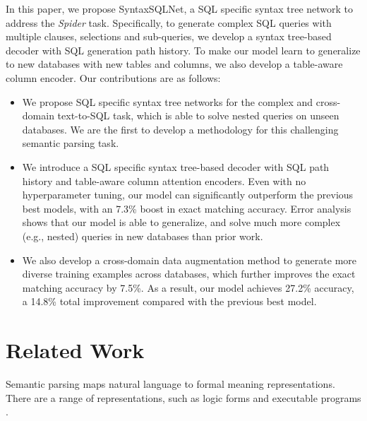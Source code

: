 \documentclass[11pt,a4paper]{article}
\begin{document}
In this paper, we propose SyntaxSQLNet, a SQL specific syntax tree network to address the \textit{Spider} task.
Specifically, to generate complex SQL queries with multiple clauses, selections and sub-queries, we develop a syntax tree-based decoder with SQL generation path history.
To make our model learn to generalize to new databases with new tables and columns, we also develop a table-aware column encoder.
Our contributions are as follows: \vspace{-2mm}
\begin{itemize}
\setlength{\itemsep}{-0.5mm}
\setlength{\leftskip}{-4mm}
\item We propose SQL specific syntax tree networks for the complex and cross-domain text-to-SQL task,
    which is able to solve nested queries on unseen databases.
    We are the first to develop a methodology for this challenging semantic parsing task.
    
    \item We introduce a SQL specific syntax tree-based decoder with SQL path history and table-aware column attention encoders. 
Even with no hyperparameter tuning, our model can significantly outperform the previous best models, with an 7.3\% boost in exact matching accuracy. Error analysis shows that our model is able to generalize, and solve much more complex (e.g., nested) queries in new databases than prior work.
    \item We also develop a cross-domain data augmentation method to generate more diverse training examples across databases, which further improves the exact matching accuracy by 7.5\%. As a result, our model achieves 27.2\% accuracy, a 14.8\% total improvement compared with the previous best model.
\end{itemize}

\section{Related Work}
\label{sec:rel}

Semantic parsing maps natural language to formal meaning representations. There are a range of representations, such as logic forms and executable programs \cite{zelle96,Zettlemoyer05,wong07,Das10,Liang11,banarescu13,artzi13,Reddy14,Berant14,pasupat2015compositional,herzig18}.
\end{document}
